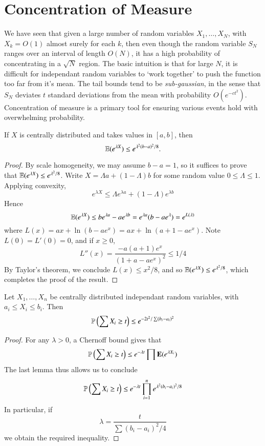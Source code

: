 \section{Concentration of Measure}

We have seen that given a large number of random variables $X_1, \dots, X_N$, with $X_k = O(1)$ almost surely for each $k$, then even though the random variable $S_N$ ranges over an interval of length $O(N)$, it has a high probability of concentrating in a $\sqrt{N}$ region. The basic intuition is that for large $N$, it is difficult for independant random variables to `work together' to push the function too far from it's mean. The tail bounds tend to be \emph{sub-gaussian}, in the sense that $S_N$ deviates $t$ standard deviations from the mean with probability $O(e^{-c t^2})$. Concentration of measure is a primary tool for ensuring various events hold with overwhelming probability.

\begin{lemma}
    If $X$ is centrally distributed and takes values in $[a,b]$, then
    \[ \operatorname{\mathbb{E}}(e^{\lambda X}) \leq e^{\lambda^2(b-a)^2/8}. \]
\end{lemma}
\begin{proof}
    By scale homogeneity, we may assume $b - a = 1$, so it suffices to prove that $\operatorname{\mathbb{E}}(e^{\lambda X}) \leq e^{\lambda^2/8}$. Write $X = \Lambda a + (1 - \Lambda) b$ for some random value $0 \leq \Lambda \leq 1$. Applying convexity,
    \[ e^{\lambda X} \leq \Lambda e^{\lambda a} + (1 - \Lambda) e^{\lambda b} \]
    Hence
    \[ \operatorname{\mathbb{E}}(e^{\lambda X}) \leq b e^{\lambda a} - a e^{\lambda b} = e^{\lambda a} (b - ae^{\lambda}) = e^{L(\lambda)} \]
    where $L(x) = a x + \ln(b - ae^x) = ax + \ln(a + 1 - ae^x)$. Note $L(0) = L'(0) = 0$, and if $x \geq 0$,
    \[ L''(x) = \frac{-a(a+1)e^x}{(1 + a - ae^x)^2} \leq 1/4 \]
    By Taylor's theorem, we conclude $L(x) \leq x^2/8$, and so $\operatorname{\mathbb{E}}(e^{\lambda X}) \leq e^{\lambda^2/8}$, which completes the proof of the result.
\end{proof}

\begin{theorem}
    Let $X_1, \dots, X_n$ be centrally distributed independant random variables, with $a_i \leq X_i \leq b_i$. Then
    \[ \mathbb{P} \left( \sum X_i \geq t \right) \leq e^{-2t^2/\sum (b_i - a_i)^2} \]
\end{theorem}
\begin{proof}
For any $\lambda > 0$, a Chernoff bound gives that
    \[ \operatorname{\mathbb{P}} \left( \sum X_i \geq t \right) \leq e^{- \lambda t} \prod \mathbf{E}(e^{\lambda X_i}) \]
    The last lemma thus allows us to conclude
    \[ \mathbb{P} \left( \sum X_i \geq t \right) \leq e^{-\lambda t} \prod_{i = 1}^n e^{\lambda^2 (b_i - a_i)^2/8} \]
    In particular, if
    \[ \lambda = \frac{t}{\sum (b_i - a_i)^2/4} \]
    we obtain the required inequality.
\end{proof}

